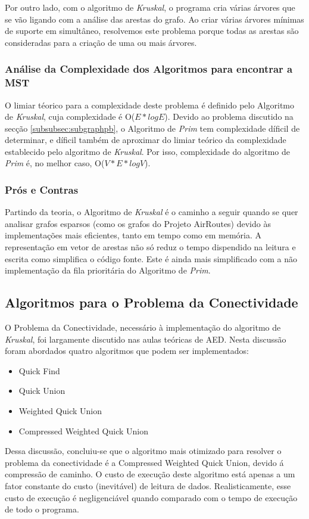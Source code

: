 \documentclass[14pt]{article}
\begin{document}
    Por outro lado, com o algoritmo de \emph{Kruskal}, o programa cria várias árvores que se vão ligando com a análise das arestas do grafo. Ao criar
    várias árvores mínimas de suporte em simultâneo, resolvemos este problema porque todas as arestas são consideradas para a criação de uma ou
    mais árvores.
    
    \subsubsection[Análise da Complexidade dos Algoritmos de procura da MST]{Análise da Complexidade dos Algoritmos para encontrar a MST}\label{subsubsec:complexity}
    O limiar téorico para a complexidade deste problema é definido pelo Algoritmo de \emph{Kruskal}, cuja complexidade é O(\(E*log E\)).
    Devido ao problema discutido na secção \ref{subsubsec:subgraphpb}, o Algoritmo de \emph{Prim} tem complexidade díficil de determinar, e díficil
    também de aproximar do limiar teórico da complexidade establecido pelo algoritmo de \emph{Kruskal}.
    Por isso, complexidade do algoritmo de \emph{Prim} é, no melhor caso, O(\(V*E*log V\)).

    \subsubsection[Prós e Contras dos algoritmos de procura da MST]{Prós e Contras}
    Partindo da teoria, o Algoritmo de \emph{Kruskal} é o caminho a seguir quando se quer analisar grafos esparsos (como os grafos do Projeto AirRoutes) devido
    às implementações mais eficientes, tanto em tempo como em memória. A representação em vetor de arestas não só reduz o tempo dispendido na leitura
    e escrita como simplifica o código fonte. Este é ainda mais simplificado com a não implementação da fila prioritária do Algoritmo de \emph{Prim}.

    \subsection[Algoritmos para o Problema da Conectividade]{Algoritmos para o Problema da Conectividade} 
    O Problema da Conectividade, necessário à implementação do algoritmo de \emph{Kruskal}, foi largamente discutido nas aulas teóricas de AED\@. Nesta discussão
    foram abordados quatro algoritmos que podem ser implementados:
    \begin{itemize}
        \item Quick Find
        \item Quick Union
        \item Weighted Quick Union
        \item Compressed Weighted Quick Union
    \end{itemize}
    Dessa discussão, concluiu-se que o algoritmo mais otimizado para resolver o problema da conectividade é a Compressed Weighted Quick Union, devido á compressão de caminho.
    O custo de execução deste algoritmo está apenas a um fator constante do custo (inevitável) de leitura de dados.
    Realisticamente, esse custo de execução é negligenciável quando comparado com o tempo de execução de todo o programa.
\end{document}
